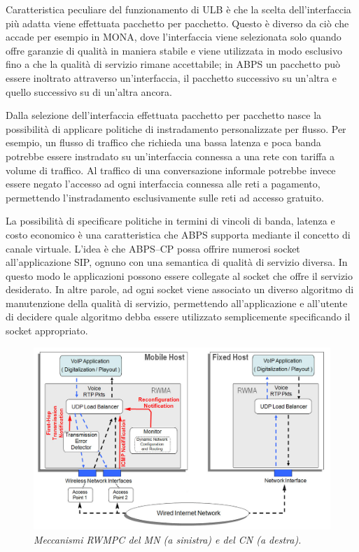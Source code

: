 \documentclass[12pt,a4paper,openright,twoside,draft]{book}
\begin{document}
Caratteristica peculiare del funzionamento di ULB è che la scelta
dell'interfaccia più adatta viene effettuata pacchetto per
pacchetto. Questo è diverso da ciò che accade per esempio in MONA,
dove l'interfaccia viene selezionata solo quando offre garanzie di
qualità in maniera stabile e viene utilizzata in modo esclusivo fino a
che la qualità di servizio rimane accettabile; in ABPS un pacchetto
può essere inoltrato attraverso un'interfaccia, il pacchetto
successivo su un'altra e quello successivo su di un'altra ancora.

Dalla selezione dell'interfaccia effettuata pacchetto per pacchetto
nasce la possibilità di applicare politiche di instradamento
personalizzate per flusso. Per esempio, un flusso di traffico che
richieda una bassa latenza e poca banda potrebbe essere instradato su
un'interfaccia connessa a una rete con tariffa a volume di
traffico. Al traffico di una conversazione informale potrebbe invece
essere negato l'accesso ad ogni interfaccia connessa alle reti a
pagamento, permettendo l'instradamento esclusivamente sulle reti ad
accesso gratuito.

La possibilità di specificare politiche in termini di vincoli di
banda, latenza e costo economico è una caratteristica che ABPS
supporta mediante il concetto di canale virtuale. L'idea è che
ABPS--CP possa offrire numerosi socket all'applicazione SIP, ognuno
con una semantica di qualità di servizio diversa. In questo modo le
applicazioni possono essere collegate al socket che offre il servizio
desiderato. In altre parole, ad ogni socket viene associato un diverso
algoritmo di manutenzione della qualità di servizio, permettendo
all'applicazione e all'utente di decidere quale algoritmo debba essere
utilizzato semplicemente specificando il socket appropriato.

\begin{figure}
  \centering
  \includegraphics[width=\textwidth]{img/rwma}
  \caption{\em Meccanismi RWMPC del MN (a sinistra) e del CN (a
    destra).}
  \label{fig:abps:rwmpc}
\end{figure}
\end{document}
